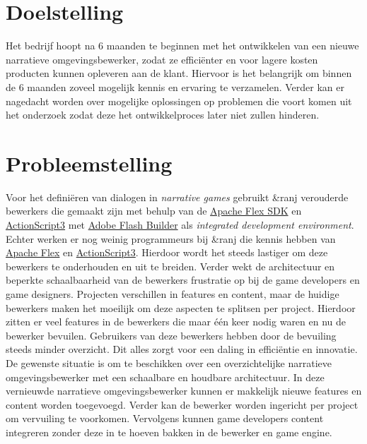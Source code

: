 \documentclass{report}
\newcommand{\organisation}{\&ranj }
\begin{document}
\section{Doelstelling}
Het bedrijf hoopt na 6 maanden te beginnen met het ontwikkelen van een nieuwe narratieve omgevingsbewerker, zodat ze effici{\"e}nter en voor lagere kosten producten kunnen opleveren aan de klant. Hiervoor is het belangrijk om binnen de 6 maanden zoveel mogelijk kennis en ervaring te verzamelen. Verder kan er nagedacht worden over mogelijke oplossingen op problemen die voort komen uit het onderzoek zodat deze het ontwikkelproces later niet zullen hinderen.

\section{Probleemstelling}
Voor het defini{\"e}ren van dialogen in \emph{narrative games} gebruikt \organisation verouderde bewerkers die gemaakt zijn met behulp van de \href{https://en.wikipedia.org/wiki/Apache_Flex}{Apache Flex SDK} en \href{http://www.adobe.com/devnet/actionscript/articles/actionscript3_overview.html}{ActionScript3} met \href{https://en.wikipedia.org/wiki/Adobe_Flash_Builder}{Adobe Flash Builder} als \emph{integrated development environment}. Echter werken er nog weinig programmeurs bij \organisation die kennis hebben van \href{https://en.wikipedia.org/wiki/Apache_Flex}{Apache Flex} en \href{http://www.adobe.com/devnet/actionscript/articles/actionscript3_overview.html}{ActionScript3}. Hierdoor wordt het steeds lastiger om deze bewerkers te onderhouden en uit te breiden. Verder wekt de architectuur en beperkte schaalbaarheid van de bewerkers frustratie op bij de game developers en game designers. Projecten verschillen in features en content, maar de huidige bewerkers maken het moeilijk om deze aspecten te splitsen per project. Hierdoor zitten er veel features in de bewerkers die maar {\'e}{\'e}n keer nodig waren en nu de bewerker bevuilen. Gebruikers van deze bewerkers hebben door de bevuiling steeds minder overzicht. Dit alles zorgt voor een daling in effici{\"e}ntie en innovatie.
De gewenste situatie is om te beschikken over een overzichtelijke narratieve omgevingsbewerker met een schaalbare en houdbare architectuur. In deze vernieuwde narratieve omgevingsbewerker kunnen er makkelijk nieuwe features en content worden toegevoegd. Verder kan de bewerker worden ingericht per project om vervuiling te voorkomen. Vervolgens kunnen game developers content integreren zonder deze in te hoeven bakken in de bewerker en game engine.
\end{document}
